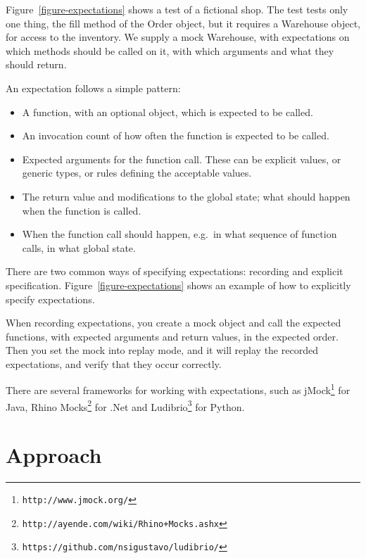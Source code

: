\documentclass[a4paper,11pt]{kth-mag}
\begin{document}
Figure~\ref{figure-expectations} shows a test of a fictional shop. The test
tests only one thing, the fill method of the Order object, but it requires a
Warehouse object, for access to the inventory. We supply a mock Warehouse, with
expectations on which methods should be called on it, with which arguments and
what they should return.

An expectation follows a simple pattern:

\begin{itemize}
	\item A function, with an optional object, which is expected to be called.
	\item An invocation count of how often the function is expected to be called.
	\item Expected arguments for the function call. These can be explicit values,
		or generic types, or rules defining the acceptable values.
	\item The return value and modifications to the global state; what should
		happen when the function is called.
	\item When the function call should happen, e.g.\ in what sequence of
		function calls, in what global state.
\end{itemize}

There are two common ways of specifying expectations: recording and explicit
specification. Figure~\ref{figure-expectations} shows an example of how to
explicitly specify expectations.

When recording expectations, you create a mock object and call the expected
functions, with expected arguments and return values, in the expected order.
Then you set the mock into replay mode, and it will replay the recorded
expectations, and verify that they occur correctly.

There are several frameworks for working with expectations, such as
jMock\footnote{\texttt{http://www.jmock.org/}} for Java, Rhino
Mocks\footnote{\texttt{http://ayende.com/wiki/Rhino+Mocks.ashx}} for .Net and
Ludibrio\footnote{\texttt{https://github.com/nsigustavo/ludibrio/}} for Python.






\pagestyle{newchap}
\chapter{Approach} \label{chapter-approach}
\end{document}
